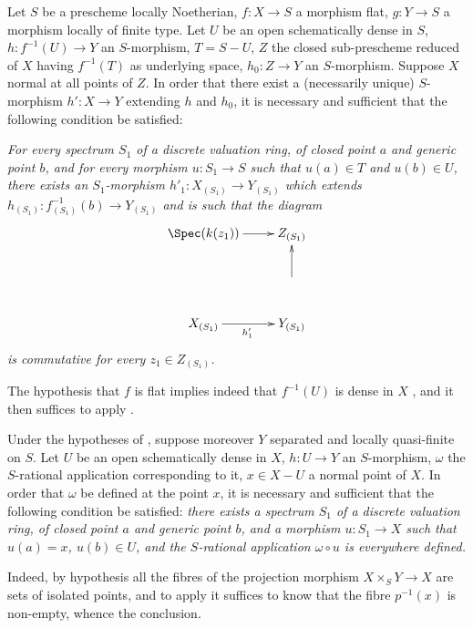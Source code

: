 \begin{corollary}[20.4.9]
\label{IV.20.4.9}
Let $S$ be a prescheme locally Noetherian, $f:X\to S$ a morphism flat, $g:Y\to S$ a morphism locally of finite type.
Let $U$ be an open schematically dense in $S$, $h:f^{-1}(U)\to Y$ an $S$-morphism, $T=S-U$, $Z$ the closed sub-prescheme reduced of $X$ having $f^{-1}(T)$ as underlying space, $h_0:Z\to Y$ an $S$-morphism.
Suppose $X$ normal at all points of $Z$.
In order that there exist a (necessarily unique) $S$-morphism $h':X\to Y$ extending $h$ and $h_0$, it is necessary and sufficient that the following condition be satisfied:

\emph{For every spectrum $S_1$ of a discrete valuation ring, of closed point $a$ and generic point $b$, and for every morphism $u:S_1\to S$ such that $u(a)\in T$ and $u(b)\in U$, there exists an $S_1$-morphism $h'_1:X_{(S_1)}\to Y_{(S_1)}$ which extends $h_{(S_1)}:f_{(S_1)}^{-1}(b)\to Y_{(S_1)}$ and is such that the diagram}
\[
  \xymatrix{
  \Spec(k(z_1)) \ar[r] & Z_{(S_1)} \\
  & \ar[u] \\
  X_{(S_1)} \ar[r]_{h'_1} & Y_{(S_1)}
  }
\]
\emph{is commutative for every $z_1\in Z_{(S_1)}$.}

The hypothesis that $f$ is flat implies indeed that $f^{-1}(U)$ is dense in $X$ , and it then suffices to apply .
\end{corollary}

\begin{corollary}[20.4.10]
\label{IV.20.4.10}
Under the hypotheses of , suppose moreover $Y$ separated and locally quasi-finite on $S$.
Let $U$ be an open schematically dense in $X$, $h:U\to Y$ an $S$-morphism, $\omega$ the $S$-rational application corresponding to it, $x\in X-U$ a normal point of $X$.
In order that $\omega$ be defined at the point $x$, it is necessary and sufficient that the following condition be satisfied:
\emph{there exists a spectrum $S_1$ of a discrete valuation ring, of closed point $a$ and generic point $b$, and a morphism $u:S_1\to X$ such that $u(a)=x$, $u(b)\in U$, and the $S$-rational application $\omega\circ u$ is everywhere defined.}

Indeed, by hypothesis all the fibres of the projection morphism $X\times_S Y\to X$ are sets of isolated points, and to apply  it suffices to know that the fibre $p^{-1}(x)$ is non-empty, whence the conclusion.
\end{corollary}

